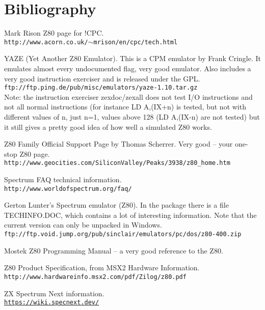 \documentclass[oneside,a4paper]{book}
\begin{document}
\chapter{Bibliography}
\begin{thebibliography}{}

	  Mark Rison Z80 page for !CPC. \\
	{\tt \small http://www.acorn.co.uk/$\sim$mrison/en/cpc/tech.html}

	 YAZE (Yet Another Z80 Emulator). This is a CPM emulator by Frank Cringle. It emulates almost every undocumented flag, very good emulator. Also includes a very good instruction exerciser and is released under the GPL. \\
	{\tt \small ftp://ftp.ping.de/pub/misc/emulators/yaze-1.10.tar.gz} \\
	Note: the instruction exerciser zexdoc/zexall does not test I/O instructions and not all normal instructions (for instance LD A,(IX+n) is tested, but not with different values of n, just n=1, values above 128 (LD A,(IX-n) are not tested) but it still gives a pretty good idea of how well a simulated Z80 works.

	 Z80 Family Official Support Page by Thomas Scherrer. Very good -- your one-stop Z80 page. \\
	{\tt \small http://www.geocities.com/SiliconValley/Peaks/3938/z80\_home.htm}

	 Spectrum FAQ technical information. \\
	{\tt \small http://www.worldofspectrum.org/faq/}

	 Gerton Lunter's Spectrum emulator (Z80). In the package there is a file TECHINFO.DOC, which contains a lot of interesting information. Note that the current version can only be unpacked in Windows. \\
	{\tt \small ftp://ftp.void.jump.org/pub/sinclair/emulators/pc/dos/z80-400.zip}

	 Mostek Z80 Programming Manual -- a very good reference to the Z80.

	 Z80 Product Specification, from MSX2 Hardware Information. \\
	{\tt \small http://www.hardwareinfo.msx2.com/pdf/Zilog/z80.pdf}

	 ZX Spectrum Next information. \\
	{\tt \small \url{https://wiki.specnext.dev/}}

\end{thebibliography}
\end{document}
